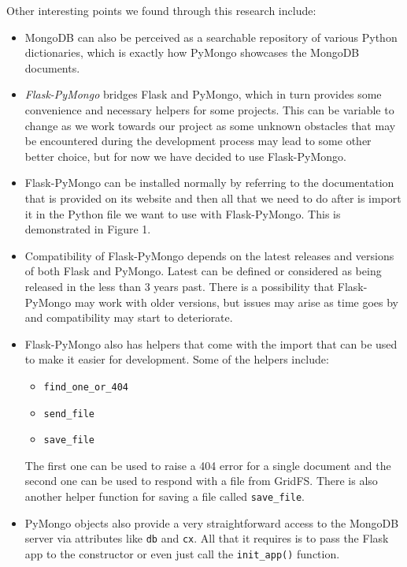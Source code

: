 \documentclass[titlepage, 12pt]{article}
\begin{document}
Other interesting points we found through this research include:

\begin{itemize}
    \item MongoDB can also be perceived as a searchable repository of various Python dictionaries, which is exactly how PyMongo showcases the MongoDB documents.
    \item \emph{Flask-PyMongo} bridges Flask and PyMongo, which in turn provides some convenience and necessary helpers for some projects. This can be variable to change as we work towards our project as some unknown obstacles that may be encountered during the development process may lead to some other better choice, but for now we have decided to use Flask-PyMongo.
    \item Flask-PyMongo can be installed normally by referring to the documentation that is provided on its website and then all that we need to do after is import it in the Python file we want to use with Flask-PyMongo. This is demonstrated in Figure 1.
    \item Compatibility of Flask-PyMongo depends on the latest releases and versions of both Flask and PyMongo. Latest can be defined or considered as being released in the less than 3 years past. There is a possibility that Flask-PyMongo may work with older versions, but issues may arise as time goes by and compatibility may start to deteriorate.
    \item Flask-PyMongo also has helpers that come with the import that can be used to make it easier for development. Some of the helpers include:
    
    \begin{itemize}
        \item \texttt{find\_one\_or\_404}
        \item \texttt{send\_file}
        \item \texttt{save\_file}
    \end{itemize}
    
    The first one can be used to raise a 404 error for a single document and the second one can be used to respond with a file from GridFS. There is also another helper function for saving a file called \texttt{save\_file}.
    \item PyMongo objects also provide a very straightforward access to the MongoDB server via attributes like \texttt{db} and \texttt{cx}. All that it requires is to pass the Flask app to the constructor or even just call the \texttt{init\_app()} function.

\end{itemize}
\end{document}
